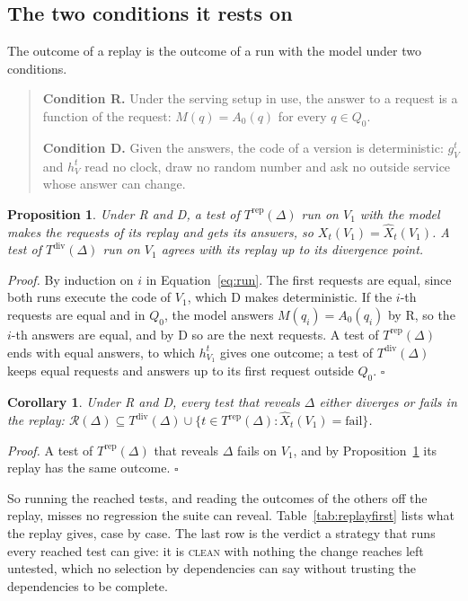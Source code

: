 \documentclass[11pt,a4paper]{article}
\newtheorem{proposition}{Proposition}
\newtheorem{corollary}{Corollary}
\newcommand{\Rev}{\mathcal{R}}
\newcommand{\clean}{\textsc{clean}}
\begin{document}
\subsection{The two conditions it rests on}

The outcome of a replay is the outcome of a run with the model under two conditions.

\begin{quote}
\textbf{Condition R.} Under the serving setup in use, the answer to a request is a function of the request: $M(q)
= A_0(q)$ for every $q \in Q_0$.

\textbf{Condition D.} Given the answers, the code of a version is deterministic: $g^t_V$ and $h^t_V$ read no
clock, draw no random number and ask no outside service whose answer can change.
\end{quote}

\begin{proposition}
\label{prop:replay}
Under R and D, a test of $T^{\mathrm{rep}}(\Delta)$ run on $V_1$ with the model makes the requests of its replay
and gets its answers, so $X_t(V_1) = \hat{X}_t(V_1)$. A test of $T^{\mathrm{div}}(\Delta)$ run on $V_1$ agrees with
its replay up to its divergence point.
\end{proposition}

\noindent\emph{Proof.} By induction on $i$ in Equation~\ref{eq:run}. The first requests are equal, since both runs
execute the code of $V_1$, which D makes deterministic. If the $i$-th requests are equal and in $Q_0$, the model
answers $M(q_i) = A_0(q_i)$ by R, so the $i$-th answers are equal, and by D so are the next requests. A test of
$T^{\mathrm{rep}}(\Delta)$ ends with equal answers, to which $h^t_{V_1}$ gives one outcome; a test of
$T^{\mathrm{div}}(\Delta)$ keeps equal requests and answers up to its first request outside $Q_0$.
\hfill$\square$

\begin{corollary}
\label{cor:safe}
Under R and D, every test that reveals $\Delta$ either diverges or fails in the replay:
$\Rev(\Delta) \subseteq T^{\mathrm{div}}(\Delta) \cup \{t \in T^{\mathrm{rep}}(\Delta) : \hat{X}_t(V_1) =
\text{fail}\}$.
\end{corollary}

\noindent\emph{Proof.} A test of $T^{\mathrm{rep}}(\Delta)$ that reveals $\Delta$ fails on $V_1$, and by
Proposition~\ref{prop:replay} its replay has the same outcome. \hfill$\square$

\medskip
So running the reached tests, and reading the outcomes of the others off the replay, misses no regression the
suite can reveal. Table~\ref{tab:replayfirst} lists what the replay gives, case by case. The last row is the
verdict a strategy that runs every reached test can give: it is \clean{} with nothing the change reaches left
untested, which no selection by dependencies can say without trusting the dependencies to be complete.
\end{document}
